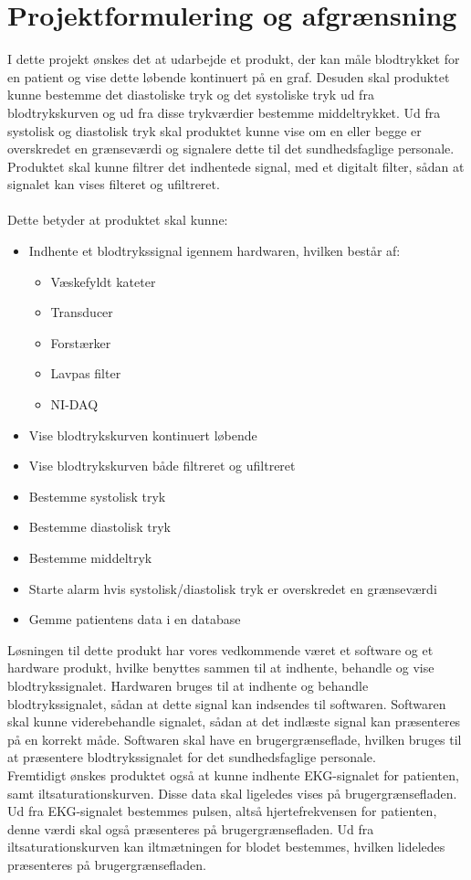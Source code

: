 \chapter{Projektformulering og afgrænsning}
I dette projekt ønskes det at udarbejde et produkt, der kan måle blodtrykket for en patient og vise dette løbende kontinuert på en graf. Desuden skal produktet kunne bestemme det diastoliske tryk og det systoliske tryk ud fra blodtrykskurven og ud fra disse trykværdier bestemme middeltrykket. Ud fra systolisk og diastolisk tryk skal produktet kunne vise om en eller begge er overskredet en grænseværdi og signalere dette til det sundhedsfaglige personale. Produktet skal kunne filtrer det indhentede signal, med et digitalt filter, sådan at signalet kan vises filteret og ufiltreret.  \\\\
Dette betyder at produktet skal kunne:
\begin{itemize}
\item Indhente et blodtrykssignal igennem hardwaren, hvilken består af:
\begin{itemize}
\item Væskefyldt kateter
\item Transducer 
\item Forstærker
\item Lavpas filter
\item NI-DAQ
\end{itemize}
\item Vise blodtrykskurven kontinuert løbende
\item Vise blodtrykskurven både filtreret og ufiltreret
\item Bestemme systolisk tryk
\item Bestemme diastolisk tryk
\item Bestemme middeltryk
\item Starte alarm hvis systolisk/diastolisk tryk er overskredet en grænseværdi
\item Gemme patientens data i en database
\end{itemize}
Løsningen til dette produkt har vores vedkommende været et software og et hardware produkt, hvilke benyttes sammen til at indhente, behandle og vise blodtrykssignalet. Hardwaren bruges til at indhente og behandle blodtrykssignalet, sådan at dette signal kan indsendes til softwaren. Softwaren skal kunne viderebehandle signalet, sådan at det indlæste signal kan præsenteres på en korrekt måde. Softwaren skal have en brugergrænseflade, hvilken bruges til at præsentere blodtrykssignalet for det sundhedsfaglige personale. \\
Fremtidigt ønskes produktet også at kunne indhente EKG-signalet for patienten, samt iltsaturationskurven. Disse data skal ligeledes vises på brugergrænsefladen. Ud fra EKG-signalet bestemmes pulsen, altså hjertefrekvensen for patienten, denne værdi skal også præsenteres på brugergrænsefladen. Ud fra iltsaturationskurven kan iltmætningen for blodet bestemmes, hvilken lideledes præsenteres på brugergrænsefladen. 
